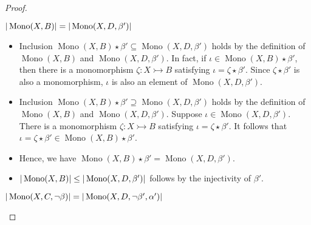 \begin{proof}
    \label{subgraph_counting:proof:dcomp_w_u}
\begin{claim}
    $|\operatorname{Mono}(X, B)| = |\operatorname{Mono}(X, D, \beta')|$
\end{claim}
\begin{itemize} 
    \item Inclusion \(\operatorname{Mono}(X, B) \star \beta' \subseteq \operatorname{Mono}(X, D, \beta')\) holds by the definition of $\operatorname{Mono}(X, B)$ and $\operatorname{Mono}(X, D, \beta')$. 
    In fact, if \(\iota  \in \operatorname{Mono}(X, B) \star \beta' \), then there is a monomorphism \(\zeta : X \rightarrowtail B\) satisfying \(\iota = \zeta \star \beta'\). Since $\zeta \star \beta'$ is also a monomorphism, \(\iota\) is also an element of \(\operatorname{Mono}(X, D, \beta')\).
    \item Inclusion \(\operatorname{Mono}(X, B) \star \beta' \supseteq \operatorname{Mono}(X, D, \beta')\) holds by the definition of $\operatorname{Mono}(X, B)$ and $\operatorname{Mono}(X, D, \beta')$.
    Suppose \(\iota \in \operatorname{Mono}(X, D, \beta')\). There is a monomorphism \(\zeta : X \rightarrowtail B\) satisfying \(\iota = \zeta \star \beta'\). It follows that \(\iota = \zeta \star \beta' \in \operatorname{Mono}(X, B) \star \beta'\).
    \item Hence, we have \(\operatorname{Mono}(X, B) \star \beta' = \operatorname{Mono}(X, D, \beta')\).
    \item $|\operatorname{Mono}(X, B)| \leq |\operatorname{Mono}(X, D, \beta')|$ follows by the injectivity of $\beta'$.
\end{itemize}
\begin{claim}
     $|\operatorname{Mono}(X, C, \lnot \beta)| = |\operatorname{Mono}(X, D, \lnot \beta', \alpha')|$
   \end{claim}
    \begin{itemize}

\end{itemize}
\end{proof}
